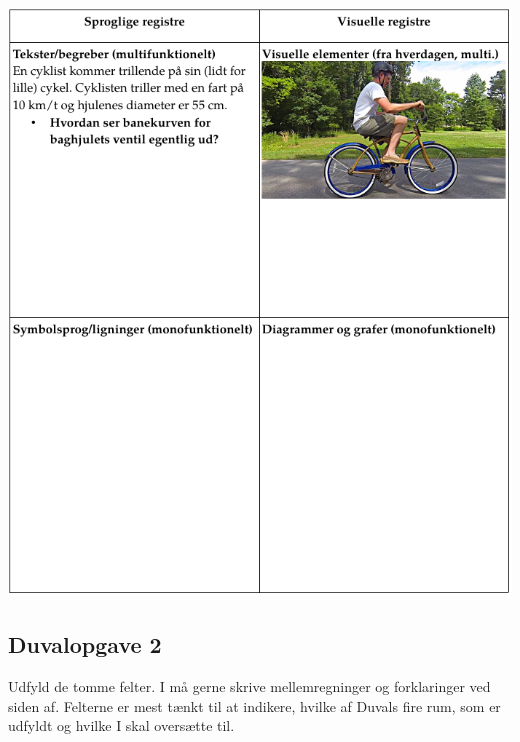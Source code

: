 \documentclass[a4paper, 12pt]{article}
\begin{document}
\begin{center}
\includegraphics[width=.9\linewidth]{img/duvalopgave_1.png}
\end{center}


\newpage

\subsection*{Duvalopgave 2}
\label{sec:org7a90609}

Udfyld de tomme felter. I må gerne skrive mellemregninger og forklaringer ved siden af. Felterne er mest tænkt til at indikere, hvilke af Duvals fire rum, som er udfyldt og hvilke I skal oversætte til.
\end{document}
